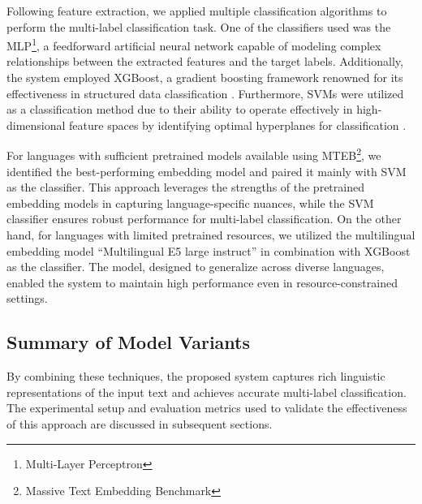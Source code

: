 Following feature extraction, we applied multiple classification algorithms to perform the multi-label classification task. One of the classifiers used was the MLP\footnote{Multi-Layer Perceptron}, a feedforward artificial neural network capable of modeling complex relationships between the extracted features and the target labels. Additionally, the system employed XGBoost, a gradient boosting framework renowned for its effectiveness in structured data classification \citep{chen2016xgboost}. Furthermore, SVMs were utilized as a classification method due to their ability to operate effectively in high-dimensional feature spaces by identifying optimal hyperplanes for classification \citep{cortes1995support}.

For languages with sufficient pretrained models available using MTEB\footnote{Massive Text Embedding Benchmark}\citep{muennighoff2022mteb}, we identified the best-performing embedding model and paired it mainly with SVM as the classifier. This approach leverages the strengths of the pretrained embedding models in capturing language-specific nuances, while the SVM classifier ensures robust performance for multi-label classification. On the other hand, for languages with limited pretrained resources, we utilized the multilingual embedding model ``Multilingual E5 large instruct'' \citep{wang2024multilingual} in combination with XGBoost as the classifier. The model, designed to generalize across diverse languages, enabled the system to maintain high performance even in resource-constrained settings.

\subsection{Summary of Model Variants}

By combining these techniques, the proposed system captures rich linguistic representations of the input text and achieves accurate multi-label classification. The experimental setup and evaluation metrics used to validate the effectiveness of this approach are discussed in subsequent sections.